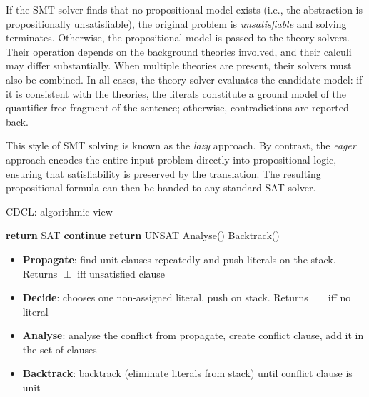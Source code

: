 If the SMT solver finds that no propositional model exists (i.e., the abstraction is propositionally unsatisfiable), the original problem is \emph{unsatisfiable} and solving terminates.
Otherwise, the propositional model is passed to the theory solvers.
Their operation depends on the background theories involved, and their calculi may differ substantially.
When multiple theories are present, their solvers must also be combined.
In all cases, the theory solver evaluates the candidate model: if it is consistent with the theories, the literals constitute a ground model of the quantifier-free fragment of the sentence; otherwise, contradictions are reported back.

\begin{remark}
This style of SMT solving is known as the \emph{lazy} approach.
By contrast, the \emph{eager} approach encodes the entire input problem directly into propositional logic, ensuring that satisfiability is preserved by the translation.
The resulting propositional formula can then be handed to any standard SAT solver.
\end{remark}


\begin{algorithm}
\caption{CDCL: algorithmic view}
\label{alg:cdcl}
\begin{algorithmic}[1]
  \While{$\top$}
        \State \textbf{return} SAT
      \EndIf
      \State \textbf{continue}
    \EndIf
      \State \textbf{return} UNSAT
    \EndIf
    \State Analyse()
    \State Backtrack()
  \EndWhile
\EndProcedure
\end{algorithmic}
\begin{itemize}
  \item[] \textbf{Propagate}: find unit clauses repeatedly and push literals on the stack. Returns $\perp$ iff unsatisfied clause
  \item[] \textbf{Decide}: chooses one non-assigned literal, push on stack. Returns $\perp$ iff no literal
  \item[] \textbf{Analyse}: analyse the conflict from propagate, create conflict clause, add it in the set of clauses
  \item[] \textbf{Backtrack}: backtrack (eliminate literals from stack) until conflict clause is unit
\end{itemize}
\end{algorithm}


